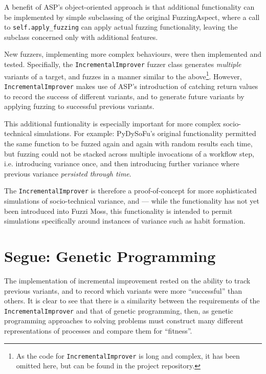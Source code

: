 \documentclass[draft]{article}
\begin{document}
A benefit of ASP's object-oriented approach is that additional functionality can
be implemented by simple subclassing of the original FuzzingAspect, where a call
to \texttt{self.apply\_fuzzing} can apply actual fuzzing functionality, leaving
the subclass concerned only with additional features.\par

New fuzzers, implementing more complex behaviours, were then implemented and
tested. Specifially, the \texttt{IncrementalImprover} fuzzer class generates
\emph{multiple} variants of a target, and fuzzes in a manner similar to the
above\footnote{As the code for \texttt{IncrementalImprover} is long and complex,
  it has been omitted here, but can be found in the project
  repository\cite{pydysofu}.}. However, \texttt{IncrementalImprover} makes use
of ASP's introduction of catching return values to record the success of
different variants, and to generate future variants by applying fuzzing to
successful previous variants.\par

This additional funtionality is especially important for more complex
socio-technical simulations. For example: PyDySoFu's original functionality
permitted the same function to be fuzzed again and again with random results
each time, but fuzzing could not be stacked across multiple invocations of a
workflow step, i.e. introducing variance once, and then introducing
further variance where previous variance \emph{persisted through time}.\par

The \texttt{IncrementalImprover} is therefore a proof-of-concept for more
sophisticated simulations of socio-technical variance, and --- while the
functionality has not yet been introduced into Fuzzi Moss, this functionality is
intended to permit simulations specifically around instances of variance such as
habit formation.\par


\section{Segue: Genetic Programming}
The implementation of incremental improvement rested on the ability to track
previous variants, and to record which variants were more ``successful'' than
others. It is clear to see that there is a similarity between the requirements
of the \texttt{IncrementalImprover} and that of genetic programming, then, as
genetic programming approaches to solving problems must construct many different
representations of processes and compare them for ``fitness''.\par
\end{document}

